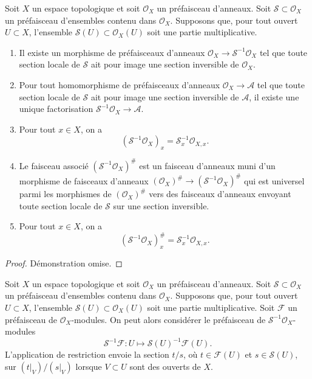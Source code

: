 \begin{lemma}
\label{lemma-simple-invert}
Soit $X$ un espace topologique et soit $\mathcal{O}_X$ un
préfaisceau d'anneaux. Soit $\mathcal{S} \subset \mathcal{O}_X$
un préfaisceau d'ensembles contenu dans $\mathcal{O}_X$.
Supposons que, pour tout ouvert $U \subset X$, l'ensemble
$\mathcal{S}(U) \subset \mathcal{O}_X(U)$ soit une partie multiplicative.
\begin{enumerate}
\item Il existe un morphisme de préfaisceaux d'anneaux
$\mathcal{O}_X \to \mathcal{S}^{-1}\mathcal{O}_X$
tel que toute section locale de $\mathcal{S}$ ait pour image une section
inversible de $\mathcal{O}_X$.
\item Pour tout homomorphisme de préfaisceaux d'anneaux
$\mathcal{O}_X \to \mathcal{A}$ tel que toute section locale
de $\mathcal{S}$ ait pour image une section inversible de $\mathcal{A}$,
il existe une unique factorisation
$\mathcal{S}^{-1}\mathcal{O}_X \to \mathcal{A}$.
\item Pour tout $x \in X$, on a
$$
(\mathcal{S}^{-1}\mathcal{O}_X)_x = \mathcal{S}_x^{-1} \mathcal{O}_{X, x}.
$$
\item Le faisceau associé $(\mathcal{S}^{-1}\mathcal{O}_X)^\#$ est un
faisceau d'anneaux muni d'un morphisme de faisceaux d'anneaux
$(\mathcal{O}_X)^\# \to (\mathcal{S}^{-1}\mathcal{O}_X)^\#$
qui est universel parmi les morphismes de $(\mathcal{O}_X)^\#$ vers des
faisceaux d'anneaux envoyant toute section locale de $\mathcal{S}$ sur une
section inversible.
\item Pour tout $x \in X$, on a
$$
(\mathcal{S}^{-1}\mathcal{O}_X)^\#_x = \mathcal{S}_x^{-1} \mathcal{O}_{X, x}.
$$
\end{enumerate}
\end{lemma}

\begin{proof}
Démonstration omise.
\end{proof}

\noindent
Soit $X$ un espace topologique et soit $\mathcal{O}_X$ un
préfaisceau d'anneaux. Soit $\mathcal{S} \subset \mathcal{O}_X$
un préfaisceau d'ensembles contenu dans $\mathcal{O}_X$.
Supposons que, pour tout ouvert $U \subset X$, l'ensemble
$\mathcal{S}(U) \subset \mathcal{O}_X(U)$ soit une partie multiplicative.
Soit $\mathcal{F}$ un préfaisceau de $\mathcal{O}_X$-modules.
On peut alors considérer le préfaisceau de
$\mathcal{S}^{-1}\mathcal{O}_X$-modules
$$
\mathcal{S}^{-1}\mathcal{F} :
U \longmapsto \mathcal{S}(U)^{-1}\mathcal{F}(U).
$$
L'application de restriction envoie la section $t/s$, où
$t \in \mathcal{F}(U)$ et $s \in \mathcal{S}(U)$, sur
$(t|_V)/(s|_V)$ lorsque $V \subset U$ sont des ouverts de $X$.

